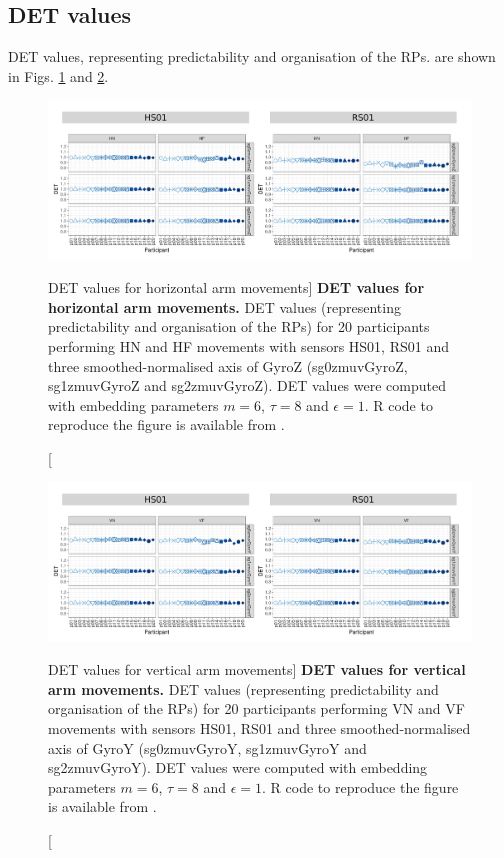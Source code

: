\newpage
\subsection{DET values}
DET values, representing predictability and organisation of the RPs.
are shown in Figs. \ref{fig:det_aH} and \ref{fig:det_aV}.


\begin{figure}
\centering
\includegraphics[width=1.0\textwidth]{det_aH}
    \caption
	[DET values for horizontal arm movements]{
	{\bf DET values for horizontal arm movements.}	
    	DET values (representing predictability and organisation of the RPs)
	for 20 participants performing HN and HF movements
	with sensors HS01, RS01 and three smoothed-normalised axis 
	of GyroZ (sg0zmuvGyroZ, sg1zmuvGyroZ and sg2zmuvGyroZ).
	DET values were computed with 
	embedding parameters $m=6$, $\tau=8$ and $\epsilon=1$.
	R code to reproduce the figure is available from \cite{xochicale2018}.
        }
    \label{fig:det_aH}
\end{figure}
\begin{figure}
\centering
\includegraphics[width=1.0\textwidth]{det_aV}
    \caption
	[DET values for vertical arm movements]{
	{\bf DET values for vertical arm movements.}	
    	DET values (representing predictability and organisation of the RPs) 
	for 20 participants performing VN and VF movements
	with sensors HS01, RS01 and three smoothed-normalised axis 
	of GyroY (sg0zmuvGyroY, sg1zmuvGyroY and sg2zmuvGyroY).
	DET values were computed with 
	embedding parameters $m=6$, $\tau=8$ and $\epsilon=1$.
	R code to reproduce the figure is available from \cite{xochicale2018}.
        }
    \label{fig:det_aV}
\end{figure}



